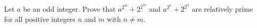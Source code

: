 Let $a$ be an odd integer. Prove that $a^{2^m}+2^{2^m}$ and $a^{2^n}+2^{2^n}$ are relatively prime for all positive integers $n$ and $m$ with $n\not= m$.